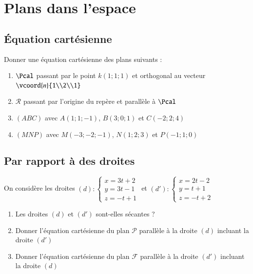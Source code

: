 \documentclass[oneside,12pt]{article}          %
\begin{document}
\section{Plans dans l'espace}

\subsection{Équation cartésienne}
Donner une équation cartésienne des plans suivants :
\begin{enumerate}
	\item $\Pcal$ passant par le point $k(1;1;1)$ et orthogonal au vecteur $\vcoord{n}{1\\2\\1}$
	\item $\mathcal{R}$ passant par l'origine du repère et parallèle à $\Pcal$
    \item $(ABC)$ avec $A(1;1;-1)$, $B(3;0;1)$ et $C(-2;2;4)$
    \item $(MNP)$ avec $M(-3;-2;-1)$, $N(1;2;3)$ et $P(-1;1;0)$
\end{enumerate}



\subsection{Par rapport à des droites}
On considère les droites $(d):\begin{cases}x=3t+2\\y=3t-1\\z=-t+1\end{cases}$ et $(d'):\begin{cases}x=2t-2\\y=t+1\\z=-t+2\end{cases}$
\begin{enumerate}
    \item Les droites $(d)$ et $(d')$ sont-elles sécantes ?
    \item Donner l'équation cartésienne du plan $\mathscr{P}$ parallèle à la droite $(d)$ incluant la droite $(d')$
    \item Donner l'équation cartésienne du plan $\mathscr{F}$ parallèle à la droite $(d')$ incluant la droite $(d)$
\end{enumerate}
\end{document}
